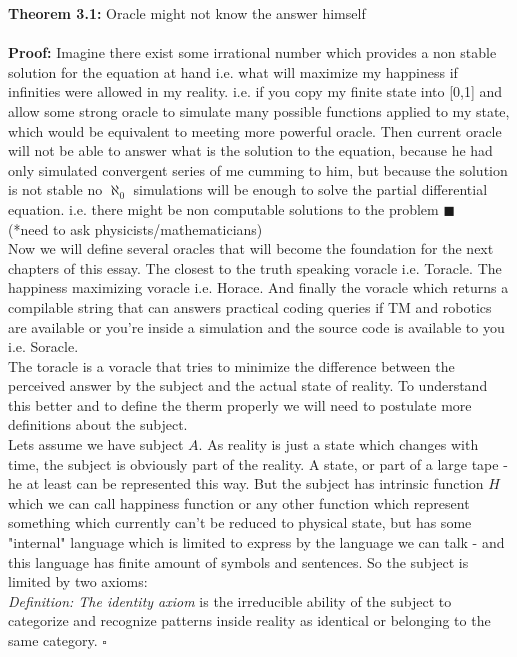 \documentclass{article}
\begin{document}
\textbf{Theorem 3.1:} Oracle might not know the answer himself
\\ \\
\textbf{Proof:}
Imagine there exist some irrational number which provides a non stable solution for the equation at hand i.e. what will maximize my happiness if infinities were allowed in my reality. i.e. if you copy my finite state into [0,1] and allow some strong oracle to simulate many possible functions applied to my state, which would be equivalent to meeting more powerful oracle. Then current oracle will not be able to answer what is the solution to the equation, because he had only simulated convergent series of me cumming to him, but because the solution is not stable no $\aleph_0$ simulations will be enough to solve the partial differential equation. i.e. there might be non computable solutions to the problem  $\blacksquare$\\ (*need to ask physicists/mathematicians) \\

Now we will define several oracles that will become the foundation for the next chapters of this essay. The closest to the truth speaking voracle i.e. Toracle. The happiness maximizing voracle i.e. Horace. And finally the voracle which returns a compilable string that can answers practical coding queries if TM and robotics are available or you're inside a simulation and the source code is available to you i.e. Soracle. \\

The toracle is a voracle that tries to minimize the difference between the perceived answer by the subject and the actual state of reality. To understand this better and to define the therm properly we will need to postulate more definitions about the subject. \\

Lets assume we have subject $A$. As reality is just a state which changes with time, the subject is obviously part of the reality. A state, or part of a large tape - he at least can be represented this way. But the subject has intrinsic function $H$ which we can call happiness function or any other function which represent something which currently can't be reduced to physical state, but has some "internal" language which is limited to express by the language we can talk - and this language has finite amount of symbols and sentences. So the subject is limited by two axioms: \\

\textit{Definition: The identity axiom} is the irreducible ability of the subject to categorize and recognize patterns inside reality as identical or belonging to the same category. $\square$\\
\end{document}
